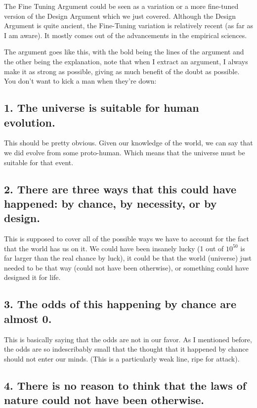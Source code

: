 The Fine Tuning Argument could be seen as a variation or a more fine-tuned version of the Design Argument which we just covered. Although the Design Argument is quite ancient, the Fine-Tuning variation is relatively recent (as far as I am aware). It mostly comes out of the advancements in the empirical sciences. 

The argument goes like this, with the bold being the lines of the argument and the other being the explanation, note that when I extract an argument, I always make it as strong as possible, giving as much benefit of the doubt as possible. You don't want to kick a man when they're down:

\subsection{1. The universe is suitable for human evolution.}

This should be pretty obvious. Given our knowledge of the world, we can say that we did evolve from some proto-human. Which means that the universe must be suitable for that event. 

\subsection{2. There are three ways that this could have happened: by chance, by necessity, or by design.}

This is supposed to cover all of the possible ways we have to account for the fact that the world has us on it. We could have been insanely lucky (1 out of $10^50$ is far larger than the real chance by luck), it could be that the world (universe) just needed to be that way (could not have been otherwise), or something could have designed it for life. 

\subsection{3. The odds of this happening by chance are almost 0.}

This is basically saying that the odds are not in our favor. As I mentioned before, the odds are so indescribably small that the thought that it happened by chance should not enter our minds. (This is a particularly weak line, ripe for attack).

\subsection{4. There is no reason to think that the laws of nature could not have been otherwise.}

